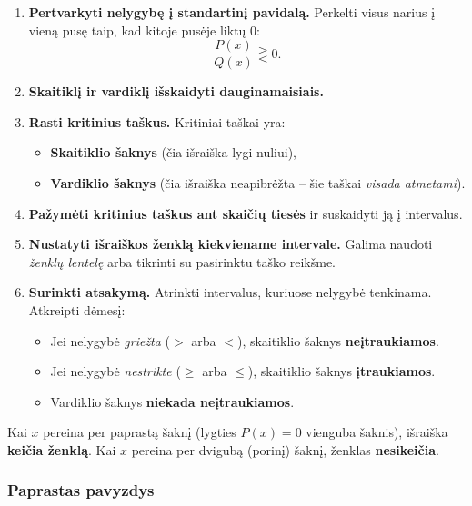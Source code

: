 \begin{enumerate}
    \item \textbf{Pertvarkyti nelygybę į standartinį pavidalą.} Perkelti visus narius į vieną pusę taip, kad kitoje pusėje liktų $0$:
    \[
        \frac{P(x)}{Q(x)} \gtreqless 0.
    \]
    \item \textbf{Skaitiklį ir vardiklį išskaidyti dauginamaisiais.}
    \item \textbf{Rasti kritinius taškus.} Kritiniai taškai yra:
        \begin{itemize}
            \item \textbf{Skaitiklio šaknys} (čia išraiška lygi nuliui),
            \item \textbf{Vardiklio šaknys} (čia išraiška neapibrėžta -- šie taškai \emph{visada atmetami}).
        \end{itemize}
    \item \textbf{Pažymėti kritinius taškus ant skaičių tiesės} ir suskaidyti ją į intervalus.
    \item \textbf{Nustatyti išraiškos ženklą kiekviename intervale.} Galima naudoti \emph{ženklų lentelę} arba tikrinti su pasirinktu taško reikšme.
    \item \textbf{Surinkti atsakymą.} Atrinkti intervalus, kuriuose nelygybė tenkinama. Atkreipti dėmesį:
        \begin{itemize}
            \item Jei nelygybė \emph{griežta} ($>$ arba $<$), skaitiklio šaknys \textbf{neįtraukiamos}.
            \item Jei nelygybė \emph{nestrikte} ($\geq$ arba $\leq$), skaitiklio šaknys \textbf{įtraukiamos}.
            \item Vardiklio šaknys \textbf{niekada neįtraukiamos}.
        \end{itemize}
\end{enumerate}

\begin{tcolorbox}[title={Ženklų keitimosi taisyklė}, colback=blue!5, colframe=blue!50]
Kai $x$ pereina per paprastą šaknį (lygties $P(x)=0$ vienguba šaknis), išraiška \textbf{keičia ženklą}. Kai $x$ pereina per dvigubą (porinį) šaknį, ženklas \textbf{nesikeičia}.
\end{tcolorbox}

\subsubsection*{Paprastas pavyzdys}

